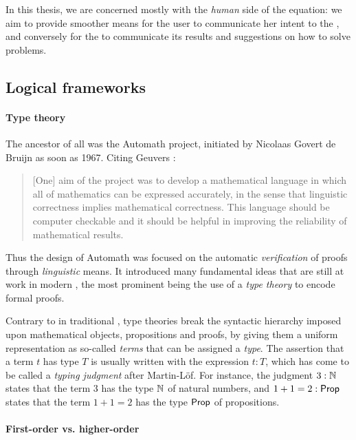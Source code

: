 \begin{emphpar}
In this thesis, we are concerned mostly with the \emph{human} side of the
equation: we aim to provide smoother means for the user to communicate her
intent to the , and conversely for the 
to communicate its results and suggestions on how to solve problems.
\end{emphpar}

\subsection{Logical frameworks}

\paragraph{Type theory}

The ancestor of all  was the Automath project, initiated by
Nicolaas Govert de Bruijn as soon as 1967. Citing Geuvers
:
\begin{quote}
[One] aim of the project was to develop a mathematical language in which all of
mathematics can be expressed accurately, in the sense that linguistic
correctness implies mathematical correctness. This language should be computer
checkable and it should be helpful in improving the reliability of mathematical
results.
\end{quote}
Thus the design of Automath was focused on the automatic \emph{verification} of
proofs through \emph{linguistic} means. It introduced many fundamental ideas
that are still at work in modern , the most prominent being the
use of a \emph{type theory} to encode formal proofs.

Contrary to  in traditional , type theories break the
syntactic hierarchy imposed upon mathematical objects, propositions and proofs,
by giving them a uniform representation as so-called \emph{terms} that can be
assigned a \emph{type}. The assertion that a term $t$ has type $T$ is usually
written with the expression $t : T$, which has come to be called a \emph{typing
judgment} after Martin-Löf. For instance, the judgment $3 : \mathbb{N}$ states that
the term $3$ has the type $\mathbb{N}$ of natural numbers, and $1 + 1 = 2 : \mathsf{Prop}$
states that the term $1 + 1 = 2$ has the type $\mathsf{Prop}$ of propositions.

\paragraph{First-order vs. higher-order}


